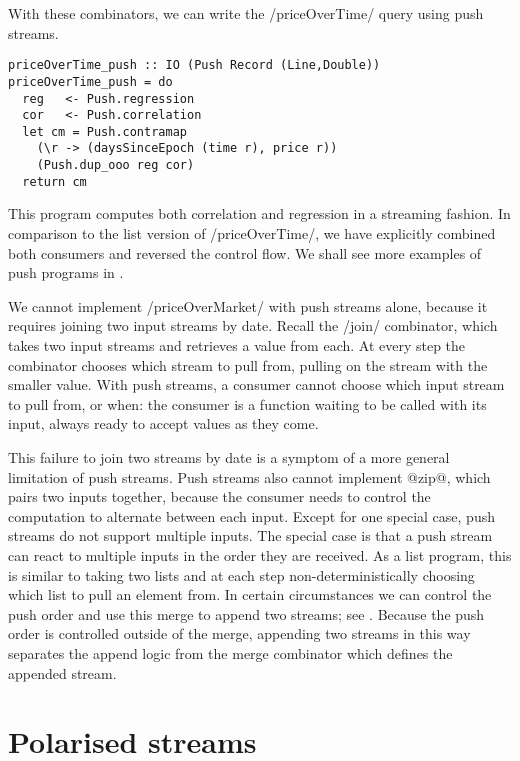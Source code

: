 With these combinators, we can write the \Hs/priceOverTime/ query using push streams.

\begin{lstlisting}
priceOverTime_push :: IO (Push Record (Line,Double))
priceOverTime_push = do
  reg   <- Push.regression
  cor   <- Push.correlation
  let cm = Push.contramap
    (\r -> (daysSinceEpoch (time r), price r))
    (Push.dup_ooo reg cor)
  return cm
\end{lstlisting}

This program computes both correlation and regression in a streaming fashion.
In comparison to the list version of \Hs/priceOverTime/, we have explicitly combined both consumers and reversed the control flow.
We shall see more examples of push programs in .

We cannot implement \Hs/priceOverMarket/ with push streams alone, because it requires joining two input streams by date.
Recall the \Hs/join/ combinator, which takes two input streams and retrieves a value from each.
At every step the combinator chooses which stream to pull from, pulling on the stream with the smaller value.
With push streams, a consumer cannot choose which input stream to pull from, or when: the consumer is a function waiting to be called with its input, always ready to accept values as they come.

This failure to join two streams by date is a symptom of a more general limitation of push streams.
Push streams also cannot implement @zip@, which pairs two inputs together, because the consumer needs to control the computation to alternate between each input.
Except for one special case, push streams do not support multiple inputs.
The special case is that a push stream can react to multiple inputs in the order they are received.
As a list program, this is similar to taking two lists and at each step non-deterministically choosing which list to pull an element from.
In certain circumstances we can control the push order and use this merge to append two streams; see .
Because the push order is controlled outside of the merge, appending two streams in this way separates the append logic from the merge combinator which defines the appended stream.

\section{Polarised streams}
\label{taxonomy/polarised}

